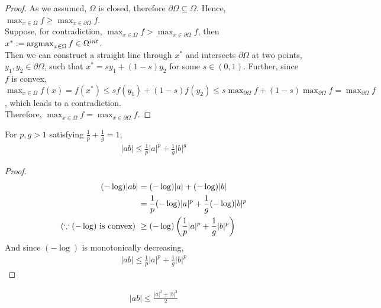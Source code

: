 \documentclass{article}
\begin{document}
    \begin{proof}
        As we assumed, $\Omega$ is closed, therefore $\partial \Omega \subseteq \Omega$. Hence, $\max_{x \in \Omega} f \geq \max_{x \in \partial \Omega} f$.\\
        Suppose, for contradiction, $\max_{x \in \Omega} f > \max_{x \in \partial \Omega} f$, then $x^* := \operatorname*{argmax}_{x \in \Omega} f \in \Omega^{int}$. \\
        Then we can construct a straight line through $x^*$ and intersects $\partial \Omega$ at two points, $y_1, y_2 \in \partial \Omega$, such that $x^* = s y_1 + (1-s) y_2$ for some $s \in (0, 1)$. Further, since $f$ is convex, $\max_{x \in \Omega}f(x) = f(x^*) \leq s f(y_1) + (1-s) f(y_2) \leq s \max_{\partial \Omega} f + (1-s) \max_{\partial \Omega} f = \max_{\partial \Omega} f$, which leads to a contradiction.\\
        Therefore, $\max_{x \in \Omega} f = \max_{x \in \partial \Omega} f$.
    \end{proof}
    
    \begin{proposition}
    	For $p, g > 1$ satisfying $\frac{1}{p} + \frac{1}{g} = 1$,
    	\begin{align}
    		|ab| \leq \frac{1}{p} |a|^p + \frac{1}{g}|b|^g
    	\end{align}
    \end{proposition}
    
    \begin{proof}
    	\begin{align}
    		(-\log) |ab| &= (-\log) |a| + (-\log) |b| \\
    		&= \frac{1}{p} (-\log) |a|^p + \frac{1}{g} (-\log) |b|^p \\
    		(\because (-\log) \text{{ is convex}})\ &\geq (-\log)\left( \frac{1}{p} |a|^p + \frac{1}{g} |b|^p \right)
    	\end{align}
    	And since $(-\log)$ is monotonically decreasing,
    	\begin{align}
    		|ab| \leq \frac{1}{p} |a|^p + \frac{1}{g} |b|^p
    	\end{align}
    \end{proof}
    
    \begin{corollary}
    	\begin{align}
    		|ab| \leq \frac{|a|^2 + |b|^2}{2}
    	\end{align}
    \end{corollary}
	
\end{document}
